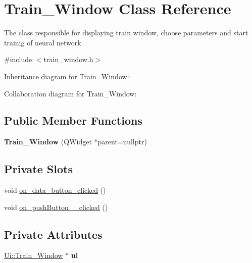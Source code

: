 \hypertarget{classTrain__Window}{}\section{Train\+\_\+\+Window Class Reference}
\label{classTrain__Window}


The class responsible for displaying train window, choose parameters and start trainig of neural network.  




{\ttfamily \#include $<$train\+\_\+window.\+h$>$}



Inheritance diagram for Train\+\_\+\+Window\+:


Collaboration diagram for Train\+\_\+\+Window\+:
\subsection*{Public Member Functions}
\begin{DoxyCompactItemize}
\item 
\mbox{\label{classTrain__Window_a2afb72b76fd8f3270b001b4054795ba9}} 
{\bfseries Train\+\_\+\+Window} (Q\+Widget $\ast$parent=nullptr)
\end{DoxyCompactItemize}
\subsection*{Private Slots}
\begin{DoxyCompactItemize}
\item 
void \hyperlink{classTrain__Window_a47d45f384226cde0801d7b44cf41bdea}{on\+\_\+data\+\_\+button\+\_\+clicked} ()
\item 
void \hyperlink{classTrain__Window_aab0ec830048b674fd6290900eca39b8c}{on\+\_\+push\+Button\+\_\+\_\+clicked} ()
\end{DoxyCompactItemize}
\subsection*{Private Attributes}
\begin{DoxyCompactItemize}
\item 
\mbox{\label{classTrain__Window_af1069aeda6458149040bc719c49b283d}} 
\hyperlink{classUi_1_1Train__Window}{Ui\+::\+Train\+\_\+\+Window} $\ast$ {\bfseries ui}
\end{DoxyCompactItemize}


